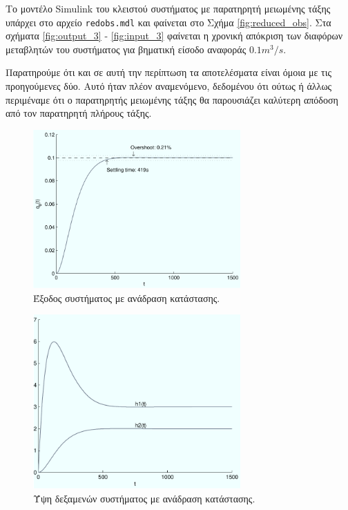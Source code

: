 \documentclass[a4paper, 11pt, english, greek]{article}
\begin{document}
Το μοντέλο \textlatin{Simulink} του κλειστού συστήματος με παρατηρητή μειωμένης τάξης υπάρχει στο αρχείο
\textlatin{\texttt{redobs.mdl}} και φαίνεται στο Σχήμα \ref{fig:reduced_obs}.
Στα σχήματα \ref{fig:output_3} - \ref{fig:input_3} φαίνεται η χρονική απόκριση των διαφόρων μεταβλητών του
συστήματος για βηματική είσοδο αναφοράς $0.1 m^3/s$.

Παρατηρούμε ότι και σε αυτή την περίπτωση τα αποτελέσματα είναι όμοια με τις προηγούμενες δύο.
Αυτό ήταν πλέον αναμενόμενο, δεδομένου ότι ούτως ή άλλως περιμέναμε ότι ο παρατηρητής μειωμένης τάξης
θα παρουσιάζει καλύτερη απόδοση από τον παρατηρητή πλήρους τάξης.

\begin{figure}[htb]
  \centering
  \includegraphics[width=300px]{output_1}
  \caption{Έξοδος συστήματος με ανάδραση κατάστασης.}
  \label{fig:output_1}
\end{figure}

\begin{figure}[htb]
  \centering
  \includegraphics[width=300px]{heights_1}
  \caption{Ύψη δεξαμενών συστήματος με ανάδραση κατάστασης.}
  \label{fig:heights_1}
\end{figure}
\end{document}
